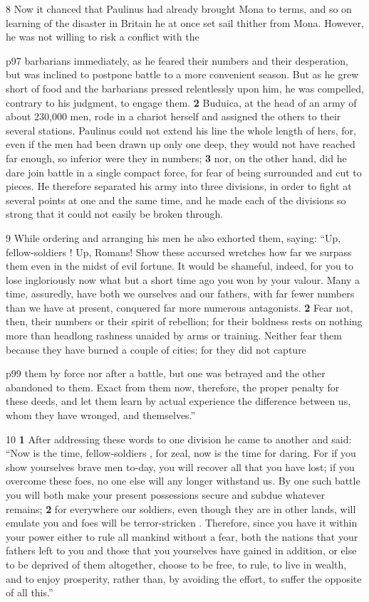 8 Now it chanced that Paulinus had already brought Mona to terms, and so on learning of the disaster in Britain he at once set sail thither from Mona. However, he was not willing to risk a conflict with the

p97 barbarians immediately, as he feared their numbers and their desperation, but was inclined to postpone battle to a more convenient season. But as he grew short of food and the barbarians pressed relentlessly upon him, he was compelled, contrary to his judgment, to engage them. \textbf{2} Buduica, at the head of an army of about 230,000 men, rode in a chariot herself and assigned the others to their several stations. Paulinus could not extend his line the whole length of hers, for, even if the men had been drawn up only one deep, they would not have reached far enough, so inferior were they in numbers; \textbf{3} nor, on the other hand, did he dare join battle in a single compact force, for fear of being surrounded and cut to pieces. He therefore separated his army into three divisions, in order to fight at several points at one and the same time, and he made each of the divisions so strong that it could not easily be broken through.

9 While ordering and arranging his men he also exhorted them, saying: ``Up, fellow-soldiers ! Up, Romans! Show these accursed wretches how far we surpass them even in the midst of evil fortune. It would be shameful, indeed, for you to lose ingloriously now what but a short time ago you won by your valour. Many a time, assuredly, have both we ourselves and our fathers, with far fewer numbers than we have at present, conquered far more numerous antagonists. \textbf{2} Fear not, then, their numbers or their spirit of rebellion; for their boldness rests on nothing more than headlong rashness unaided by arms or training. Neither fear them because they have burned a couple of cities; for they did not capture

p99 them by force nor after a battle, but one was betrayed and the other abandoned to them. Exact from them now, therefore, the proper penalty for these deeds, and let them learn by actual experience the difference between us, whom they have wronged, and themselves.''

10
\textbf{1} After addressing these words to one division he came to another and said: ``Now is the time, fellow-soldiers , for zeal, now is the time for daring. For if you show yourselves brave men to\texthebrew{‑}day, you will recover all that you have lost; if you overcome these foes, no one else will any longer withstand us. By one such battle you will both make your present possessions secure and subdue whatever remains; \textbf{2} for everywhere our soldiers, even though they are in other lands, will emulate you and foes will be terror-stricken . Therefore, since you have it within your power either to rule all mankind without a fear, both the nations that your fathers left to you and those that you yourselves have gained in addition, or else to be deprived of them altogether, choose to be free, to rule, to live in wealth, and to enjoy prosperity, rather than, by avoiding the effort, to suffer the opposite of all this.''

